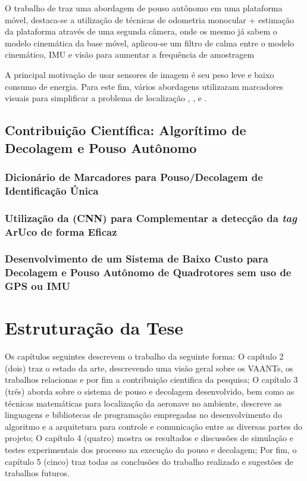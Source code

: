     O trabalho de \citet{Gilberto2016} traz uma abordagem de pouso autônomo em uma plataforma móvel, destaca-se a utilização de técnicas de odometria monocular + estimação da plataforma através de uma segunda câmera, onde os mesmo já sabem o modelo cinemática da base móvel, aplicou-se um filtro de calma entre o modelo cinemático, IMU e visão para aumentar a frequência de amostragem
    
    A principal motivação de usar sensores de imagem é seu peso leve e baixo consumo de energia. Para este fim, vários abordagens utilizaram marcadores visuais para simplificar a problema de localização \cite{Jayatilleke2013}, \cite{Faigl2013}, \cite{Pestana2016} e \cite{Salinas2013}.


\subsection{Contribuição Científica: Algorítimo de Decolagem e Pouso Autônomo}

	\subsubsection{Dicionário de Marcadores para Pouso/Decolagem de Identificação Única}

	\subsubsection{Utilização da (CNN) para Complementar a detecção da \textit{tag} ArUco de forma Eficaz}

	\subsubsection{Desenvolvimento de um Sistema de Baixo Custo para Decolagem e Pouso Autônomo de Quadrotores sem uso de GPS ou IMU}

\section{Estruturação da Tese}

Os capítulos seguintes descrevem o trabalho da seguinte forma: O capítulo 2 (dois) traz o estado da arte, descrevendo uma visão geral sobre os VAANTs, os trabalhos relacionas e por fim a contribuição cientifica da pesquisa; O capítulo 3 (três) aborda sobre o sistema de pouso e decolagem desenvolvido, bem como as técnicas matemáticas para localização da aeronave no ambiente, descreve as linguagens e bibliotecas de programação empregadas no desenvolvimento do algoritmo e a arquitetura para controle e comunicação entre as diversas partes do projeto; O capítulo 4 (quatro) mostra os resultados e discussões de simulação e testes experimentais dos processo na execução do pouso e decolagem; Por fim, o capítulo 5 (cinco) traz todas as conclusões do trabalho realizado e sugestões de trabalhos futuros.




